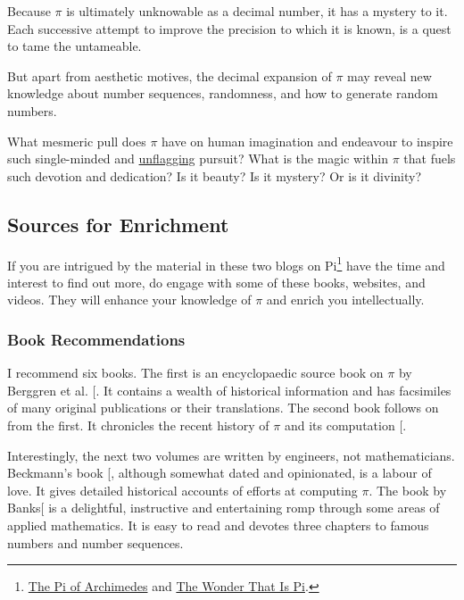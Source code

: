 \documentclass[
  a4paper,
]{article}
\begin{document}
Because \(\pi\) is ultimately unknowable as a decimal number, it has a
mystery to it. Each successive attempt to improve the precision to which
it is known, is a quest to tame the untameable.

But apart from aesthetic motives, the decimal expansion of \(\pi\) may
reveal new knowledge about number sequences, randomness, and how to
generate random numbers.

What mesmeric pull does \(\pi\) have on human imagination and endeavour
to inspire such single-minded and
\href{https://www.vocabulary.com/dictionary/unflagging}{unflagging}
pursuit? What is the magic within \(\pi\) that fuels such devotion and
dedication? Is it beauty? Is it mystery? Or is it divinity?

\subsection{Sources for Enrichment}\label{sources-for-enrichment}

If you are intrigued by the material in these two blogs on Pi\footnote{\href{https://swanlotus.netlify.app/blogs/the-pi-of-archimedes}{The
  Pi of Archimedes} and
  \href{https://swanlotus.netlify.app/blogs/the-wonder-that-is-pi}{The
  Wonder That Is Pi}.} have the time and interest to find out more, do
engage with some of these books, websites, and videos. They will enhance
your knowledge of \(\pi\) and enrich you intellectually.

\subsubsection{Book Recommendations}\label{book-recommendations}

I recommend six books. The first is an encyclopaedic source book on
\(\pi\) by Berggren et al. {[}\citeproc{ref-pi-source}{32}{]}. It
contains a wealth of historical information and has facsimiles of many
original publications or their translations. The second book follows on
from the first. It chronicles the recent history of \(\pi\) and its
computation {[}\citeproc{ref-pi-next-gen-2016}{44}{]}.

Interestingly, the next two volumes are written by engineers, not
mathematicians. Beckmann's book {[}\citeproc{ref-beckmann-1971}{24}{]},
although somewhat dated and opinionated, is a labour of love. It gives
detailed historical accounts of efforts at computing \(\pi\). The book
by Banks{[}\citeproc{ref-banks-1999}{47}{]} is a delightful, instructive
and entertaining romp through some areas of applied mathematics. It is
easy to read and devotes three chapters to famous numbers and number
sequences.
\end{document}
